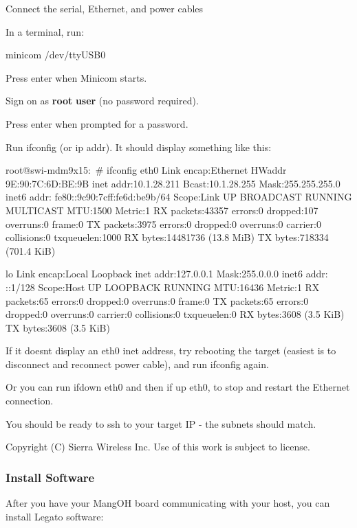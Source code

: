Connect the serial, Ethernet, and power cables

In a terminal, run\+:


\begin{DoxyCode}
minicom /dev/ttyUSB0 
\end{DoxyCode}


Press enter when Minicom starts.

Sign on as {\bfseries root} {\bfseries user} (no password required).

Press enter when prompted for a password.

Run {\ttfamily ifconfig} (or ip addr). It should display something like this\+:

\begin{DoxyVerb}root@swi-mdm9x15:~# ifconfig
eth0      Link encap:Ethernet  HWaddr 9E:90:7C:6D:BE:9B
          inet addr:10.1.28.211  Bcast:10.1.28.255  Mask:255.255.255.0
          inet6 addr: fe80::9c90:7cff:fe6d:be9b/64 Scope:Link
          UP BROADCAST RUNNING MULTICAST  MTU:1500  Metric:1
          RX packets:43357 errors:0 dropped:107 overruns:0 frame:0
          TX packets:3975 errors:0 dropped:0 overruns:0 carrier:0
          collisions:0 txqueuelen:1000
          RX bytes:14481736 (13.8 MiB)  TX bytes:718334 (701.4 KiB)

lo        Link encap:Local Loopback
          inet addr:127.0.0.1  Mask:255.0.0.0
          inet6 addr: ::1/128 Scope:Host
          UP LOOPBACK RUNNING  MTU:16436  Metric:1
          RX packets:65 errors:0 dropped:0 overruns:0 frame:0
          TX packets:65 errors:0 dropped:0 overruns:0 carrier:0
          collisions:0 txqueuelen:0
          RX bytes:3608 (3.5 KiB)  TX bytes:3608 (3.5 KiB)\end{DoxyVerb}


If it doesn\textquotesingle{}t display an eth0 inet address, try rebooting the target (easiest is to disconnect and reconnect power cable), and run {\ttfamily ifconfig} again.

Or you can run {\ttfamily ifdown} {\ttfamily eth0} and then {\ttfamily if} up {\ttfamily eth0}, to stop and restart the Ethernet connection.

You should be ready to ssh to your target I\+P -\/ the subnets should match.





Copyright (C) Sierra Wireless Inc. Use of this work is subject to license. \hypertarget{getstartedMangOHInstallSoftware}{}\subsubsection{Install Software}\label{getstartedMangOHInstallSoftware}
After you have your Mang\+O\+H board communicating with your host, you can install Legato software\+:

